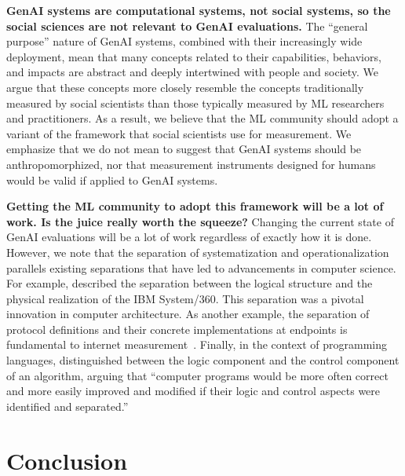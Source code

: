 \documentclass{article}
\begin{document}
\textbf{GenAI systems are computational systems, not social systems, so the social sciences are not relevant to GenAI evaluations.} 
The ``general purpose'' nature of GenAI systems, combined with their increasingly wide deployment, mean that many concepts related to their capabilities, behaviors, and impacts are abstract and deeply intertwined with people and society. We argue that these concepts more closely resemble the concepts traditionally measured by social scientists than those typically measured by ML researchers and practitioners. As a result, we believe that the ML community should adopt a variant of the framework that social scientists use for measurement. We emphasize that we do not mean to suggest that GenAI systems should be anthropomorphized, nor that measurement instruments designed for humans would be valid if applied to GenAI systems.

\textbf{Getting the ML community to adopt this framework will be a lot of work. Is the juice really worth the squeeze?} 
Changing the 
current state of GenAI evaluations will be a lot of work regardless of exactly how it is done. However, we note that the separation of systematization and operationalization parallels existing separations that have led to advancements in computer science. For example, \citet{amdahl1964architecture} described the separation between the logical structure and the physical realization of the IBM System/360. This separation was a pivotal innovation in computer architecture. As another example, the separation of protocol definitions and their concrete implementations at endpoints is fundamental to internet measurement~\cite{saltzer1984endtoend}. Finally, in the context of programming languages, \citet{kowalski1979algorithm} distinguished between the logic component and the control component of an algorithm, arguing that ``computer programs would be more often correct and more easily improved and modified if their logic and control aspects were identified and separated.''

\section{Conclusion}
\label{sec:conclusion}
\end{document}

